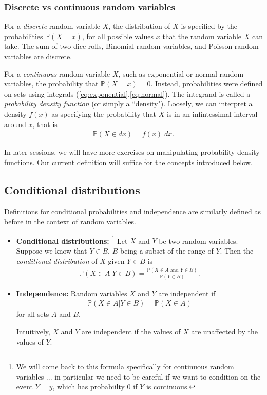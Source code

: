 \documentclass[11pt]{article}
\theoremstyle{definition}
\renewcommand{\P}{\mathbb{P}}
\begin{document}
\subsubsection*{Discrete vs continuous random variables}

For a \textit{discrete} random variable $X$, the distribution of $X$ is specified
by the probabilities $\P(X = x)$, for all possible values $x$ that the random variable $X$
can take. The sum of two dice rolls, Binomial random variables, and Poisson random variables
are discrete.

For a \textit{continuous} random variable $X$, such as exponential or normal random variables,
the probability that $\P(X = x) = 0$. Instead, probabilities were defined on sets
using integrals (\ref{eq:exponential},\ref{eq:normal}).
The integrand is called a \textit{probability density function} (or simply a ``density"). Loosely,
we can interpret a density $f(x)$ as specifying the probability that $X$ is in an infintessimal
interval around $x$, that is
\begin{align*}
  \P(X \in dx) = f(x)\;dx.
\end{align*}

In later sessions, we will have more exercises on manipulating probability density functions.
Our current definition will suffice for the concepts introduced below.

\subsection{Conditional distributions}
Definitions for conditional probabilities and independence are similarly defined
as before in the context of random variables.
\begin{itemize}
  \item {\bf Conditional distributions: }\footnote{
  We will come back to this formula specifically for continuous random variables ...
  in particular we need to be careful if we want to condition on the event $Y = y$,
  which has probabiilty 0 if $Y$ is continuous.
  }
  Let $X$ and $Y$ be two random variables. Suppose we know that $Y\in B$, $B$
  being a subset of the range of $Y$. Then the
  \textit{conditional distribution} of $X$ given $Y\in B$ is
  \begin{align*}
    \P(X\in A | Y \in B) = \frac{\P(X\in A \text{ and } Y \in B)}{\P(Y \in B)}.
  \end{align*}
  \item {\bf Independence: } Random variables $X$ and $Y$ are independent if
  \begin{align*}
    \P(X\in A | Y \in B) = \P(X\in A)
  \end{align*}
  for all sets $A$ and $B$.

  Intuitively, $X$ and $Y$ are independent if the values of $X$ are unaffected
  by the values of $Y$.
\end{itemize}
\end{document}
